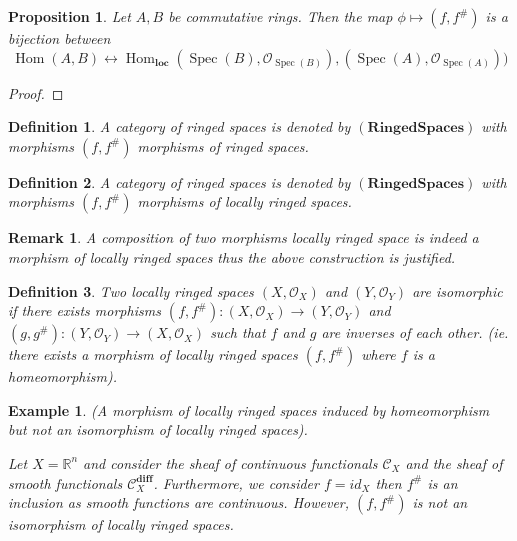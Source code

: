 \documentclass{article}
\newtheorem{proposition}{Proposition}[section]
\newtheorem{definition}{Definition}[section]
\newtheorem{remark}{Remark}[section]
\newtheorem{example}{Example}[section]
\numberwithin{equation}{section}
\DeclareMathOperator{\Hom}{Hom}
\DeclareMathOperator{\Spec}{Spec}
\begin{document}
\begin{proposition}
Let $A,B$ be commutative rings. Then the map $\phi\mapsto(f,f^{\#})$ is a bijection between
\begin{equation*}
\Hom(A,B)\leftrightarrow \Hom_{\mathbf{loc}}(\Spec(B),\mathcal{O}_{\Spec(B)}),(\Spec(A),\mathcal{O}_{\Spec(A)}))
\end{equation*}
\end{proposition}

\begin{proof}
\end{proof}

\begin{definition}
A category of ringed spaces is denoted by $(\mathbf{Ringed Spaces})$ with morphisms $(f,f^{\#})$ morphisms of ringed spaces. 
\end{definition}

\begin{definition}
A category of ringed spaces is denoted by $(\mathbf{Ringed Spaces})$ with morphisms $(f,f^{\#})$ morphisms of locally ringed spaces. 
\end{definition}

\begin{remark}
A composition of two morphisms locally ringed space is indeed a morphism of locally ringed spaces thus the above construction is justified.%
\end{remark}

\begin{definition}
Two locally ringed spaces $(X,\mathcal{O}_X)$ and $(Y,\mathcal{O}_Y)$ are isomorphic if there exists morphisms $(f,f^{\#}):(X,\mathcal{O}_X)\to(Y,\mathcal{O}_Y)$ and $(g,g^{\#}):(Y,\mathcal{O}_Y)\to(X,\mathcal{O}_X)$ such that $f$ and $g$ are inverses of each other. (ie. there exists a morphism of locally ringed spaces $(f,f^{\#})$ where $f$ is a homeomorphism).%
\end{definition}

\begin{example}(A morphism of locally ringed spaces induced by homeomorphism but not an isomorphism of locally ringed spaces).\\
\par Let $X=\mathbb{R}^n$ and consider the sheaf of continuous functionals $\mathcal{C}_X$ and the sheaf of smooth functionals $\mathcal{C}^{\mathbf{diff}}_X$. Furthermore, we consider $f=id_X$ then $f^{\#}$ is an inclusion as smooth functions are continuous. 
However, $(f,f^{\#})$ is not an isomorphism of locally ringed spaces.
\end{example}
\end{document}
